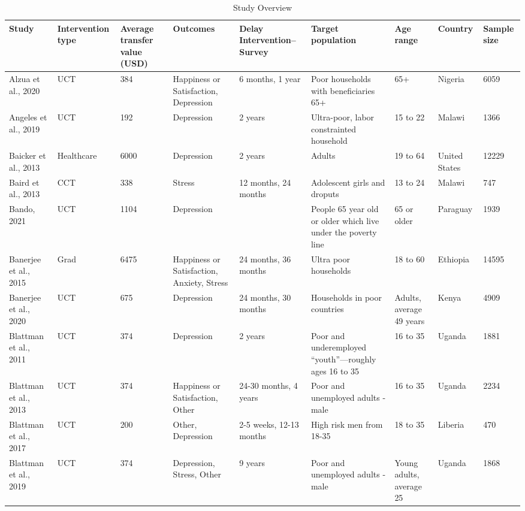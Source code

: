 \begingroup\scriptsize
\begin{longtable}{p{1.8cm}p{1.7cm}p{1.3 cm}p{1.8cm}p{1.7cm}p{1.8cm}p{1cm}p{1.2cm}p{1cm}}
\caption{Study Overview} \\ 
  \hline
{\textbf{Study}} & {\textbf{Intervention type}} & {\textbf{Average transfer value (USD)}} & {\textbf{Outcomes}} & {\textbf{Delay Intervention--Survey}} & {\textbf{Target 
 population}} & {\textbf{Age 
 range}} & {\textbf{Country}} & {\textbf{Sample 
 size}} \\ 
  \hline
Alzua et al., 2020 & UCT & 384 & Happiness or Satisfaction, Depression & 6 months, 1 year & Poor households with beneficiaries 65+ & 65+ & Nigeria & 6059 \\ 
   \hline
Angeles et al., 2019 & UCT & 192 & Depression & 2 years & Ultra-poor, labor constrainted household & 15 to 22 & Malawi & 1366 \\ 
   \hline
Baicker et al., 2013 & Healthcare & 6000 & Depression & 2 years & Adults & 19 to 64 & United States & 12229 \\ 
   \hline
Baird et al., 2013 & CCT & 338 & Stress & 12 months, 24 months & Adolescent girls and droputs & 13 to 24 & Malawi & 747 \\ 
   \hline
Bando, 2021 & UCT & 1104 & Depression &  & People 65 year old or older which live under the poverty line & 65 or older & Paraguay & 1939 \\ 
   \hline
Banerjee et al., 2015 & Grad & 6475 & Happiness or Satisfaction, Anxiety, Stress & 24 months, 36 months & Ultra poor households & 18 to 60 & Ethiopia & 14595 \\ 
   \hline
Banerjee et al., 2020 & UCT & 675 & Depression & 24 months, 30 months & Households in poor countries & Adults, average 49 years & Kenya & 4909 \\ 
   \hline
Blattman et al., 2011 & UCT & 374 & Depression & 2 years & Poor and underemployed “youth”—roughly ages 16 to 35 & 16 to 35 & Uganda & 1881 \\ 
   \hline
Blattman et al., 2013 & UCT & 374 & Happiness or Satisfaction, Other & 24-30 months, 4 years & Poor and unemployed adults - male & 16 to 35 & Uganda & 2234 \\ 
   \hline
Blattman et al., 2017 & UCT & 200 & Other, Depression & 2-5 weeks, 12-13 months & High risk men from 18-35 & 18 to 35 & Liberia & 470 \\ 
   \hline
Blattman et al., 2019 & UCT & 374 & Depression, Stress, Other & 9 years & Poor and unemployed adults - male & Young adults, average 25 & Uganda & 1868 \\ 

\end{longtable}
